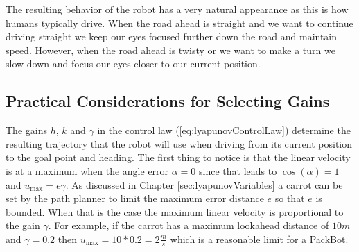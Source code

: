 The resulting behavior of the robot has a very natural appearance as this is how humans typically drive. When the road ahead is straight and we want to continue driving straight we keep our eyes focused further down the road and maintain speed. However, when the road ahead is twisty or we want to make a turn we slow down and focus our eyes closer to our current position.

\subsection{Practical Considerations for Selecting Gains}
\label{sec:lyapunovTrajectoryConvergence}
The gains $h$, $k$ and $\gamma$ in the control law (\ref{eq:lyapunovControlLaw}) determine the resulting trajectory that the robot will use when driving from its current position to the goal point and heading. The first thing to notice is that the linear velocity is at a maximum when the angle error $\alpha=0$ since that leads to $\cos(\alpha)=1$ and $u_{\text{max}}=e\gamma$. As discussed in Chapter \ref{sec:lyapunovVariables} a carrot can be set by the path planner to limit the maximum error distance $e$ so that $e$ is bounded. When that is the case the maximum linear velocity is proportional to the gain $\gamma$. For example, if the carrot has a maximum lookahead distance of $10m$ and $\gamma=0.2$ then $u_{\text{max}}=10*0.2=2\tfrac{m}{s}$ which is a reasonable limit for a PackBot.

